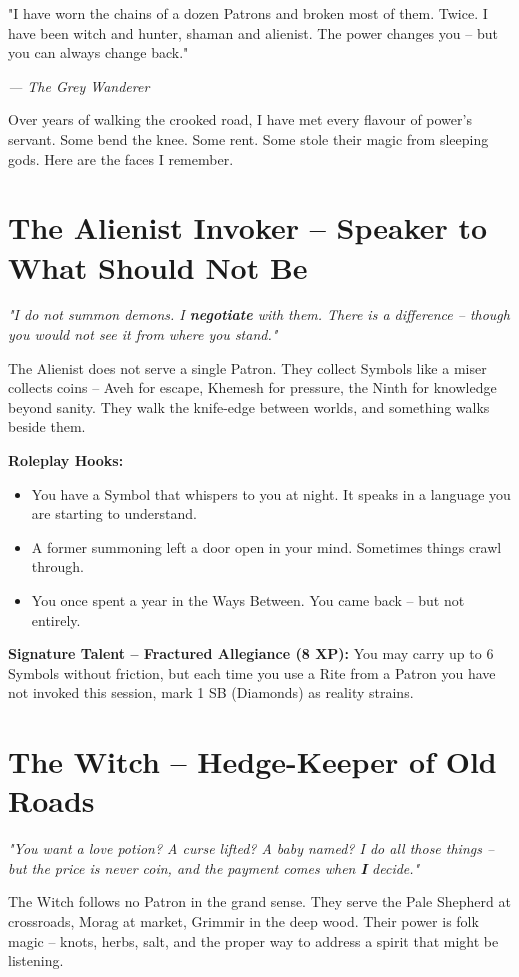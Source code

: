 \documentclass[10pt,a5paper]{book}
\begin{document}
\epigraph{"I have worn the chains of a dozen Patrons and broken most of them. Twice. I have been witch and hunter, shaman and alienist. The power changes you -- but you can always change back."}{\textit{--- The Grey Wanderer}}

Over years of walking the crooked road, I have met every flavour of power's servant. Some bend the knee. Some rent. Some stole their magic from sleeping gods. Here are the faces I remember.

\section{The Alienist Invoker -- Speaker to What Should Not Be}

\textit{"I do not summon demons. I \textbf{negotiate} with them. There is a difference -- though you would not see it from where you stand."}

The Alienist does not serve a single Patron. They collect Symbols like a miser collects coins -- Aveh for escape, Khemesh for pressure, the Ninth for knowledge beyond sanity. They walk the knife-edge between worlds, and something walks beside them.

\textbf{Roleplay Hooks:}
\begin{itemize}
    \item You have a Symbol that whispers to you at night. It speaks in a language you are starting to understand.
    \item A former summoning left a door open in your mind. Sometimes things crawl through.
    \item You once spent a year in the Ways Between. You came back -- but not entirely.
\end{itemize}

\textbf{Signature Talent -- Fractured Allegiance (8 XP):} You may carry up to 6 Symbols without friction, but each time you use a Rite from a Patron you have not invoked this session, mark 1 SB (Diamonds) as reality strains.

\section{The Witch -- Hedge-Keeper of Old Roads}

\textit{"You want a love potion? A curse lifted? A baby named? I do all those things -- but the price is never coin, and the payment comes when \textbf{I} decide."}

The Witch follows no Patron in the grand sense. They serve the Pale Shepherd at crossroads, Morag at market, Grimmir in the deep wood. Their power is folk magic -- knots, herbs, salt, and the proper way to address a spirit that might be listening.
\end{document}
